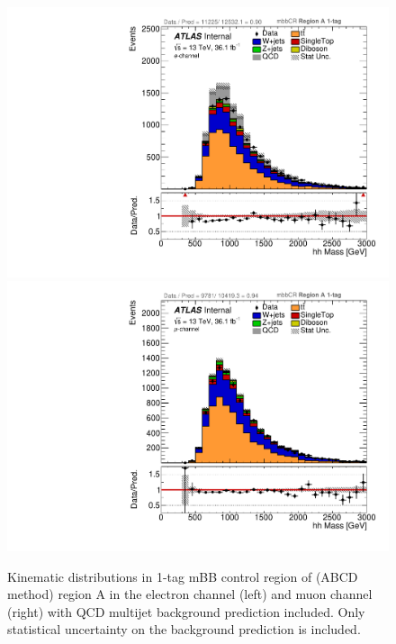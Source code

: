 \begin{figure}[!htbp]
\begin{center}
\includegraphics[scale=0.33]{./figures/boosted/ABCD_1tag0bjet/elec_mbbcr_RegionA_hhMass_withDD}   
\includegraphics[scale=0.33]{./figures/boosted/ABCD_1tag0bjet/muon_mbbcr_RegionA_hhMass_withDD}     
\caption{Kinematic distributions in 1-tag mBB control region of (ABCD method) region A in the electron channel (left) and muon channel (right)
with QCD multijet background prediction included. Only statistical uncertainty on the background prediction is included.}
\label{fig:boosted_abcd_1tag0bjet_region_a_withqcd_mbbcr}
\end{center}
\end{figure}

